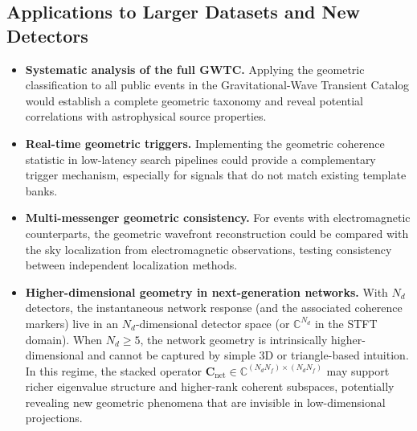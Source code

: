 \documentclass[11pt,a4paper]{article}
\begin{document}
\subsection{Applications to Larger Datasets and New Detectors}
\begin{itemize}
    \item \textbf{Systematic analysis of the full GWTC.} Applying the geometric classification to all public events in the Gravitational-Wave Transient Catalog \cite{Abbott2023} would establish a complete geometric taxonomy and reveal potential correlations with astrophysical source properties.

    \item \textbf{Real-time geometric triggers.} Implementing the geometric coherence statistic in low-latency search pipelines could provide a complementary trigger mechanism, especially for signals that do not match existing template banks.

    \item \textbf{Multi-messenger geometric consistency.} For events with electromagnetic counterparts, the geometric wavefront reconstruction could be compared with the sky localization from electromagnetic observations, testing consistency between independent localization methods.

    \item \textbf{Higher-dimensional geometry in next-generation networks.} With $N_d$ detectors, the instantaneous network response (and the associated coherence markers) live in an $N_d$-dimensional detector space (or $\mathbb{C}^{N_d}$ in the STFT domain). When $N_d\ge 5$, the network geometry is intrinsically higher-dimensional and cannot be captured by simple 3D or triangle-based intuition. In this regime, the stacked operator $\mathbf{C}_{\mathrm{net}}\in\mathbb{C}^{(N_d N_f)\times(N_d N_f)}$ may support richer eigenvalue structure and higher-rank coherent subspaces, potentially revealing new geometric phenomena that are invisible in low-dimensional projections.
\end{itemize}
\end{document}
